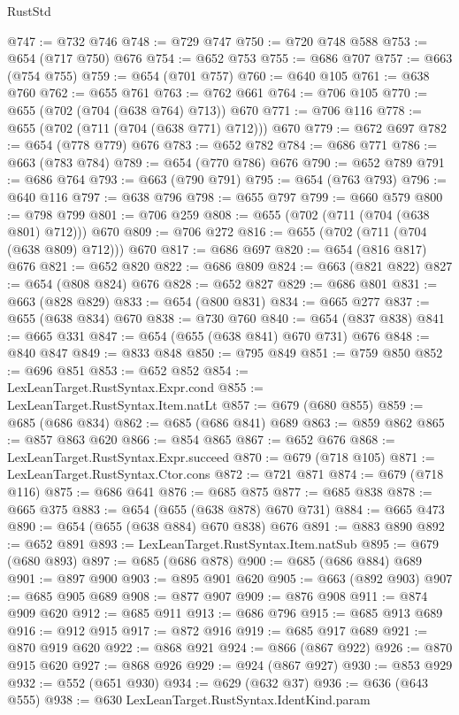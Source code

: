 \begin{lexlean}{RustStd}
\begin{coremodule}
{\begin{coremodule}
{{{{{{{{{{{{{{{@747 := @732 @746
@748 := @729 @747
@750 := @720 @748 @588
@753 := @654 (@717 @750) @676
@754 := @652 @753
@755 := @686 @707
@757 := @663 (@754 @755)
@759 := @654 (@701 @757)
@760 := @640 @105
@761 := @638 @760
@762 := @655 @761
@763 := @762 @661
@764 := @706 @105
@770 := @655 (@702 (@704 (@638 @764) @713)) @670
@771 := @706 @116
@778 := @655 (@702 (@711 (@704 (@638 @771) @712))) @670
@779 := @672 @697
@782 := @654 (@778 @779) @676
@783 := @652 @782
@784 := @686 @771
@786 := @663 (@783 @784)
@789 := @654 (@770 @786) @676
@790 := @652 @789
@791 := @686 @764
@793 := @663 (@790 @791)
@795 := @654 (@763 @793)
@796 := @640 @116
@797 := @638 @796
@798 := @655 @797
@799 := @660 @579
@800 := @798 @799
@801 := @706 @259
@808 := @655 (@702 (@711 (@704 (@638 @801) @712))) @670
@809 := @706 @272
@816 := @655 (@702 (@711 (@704 (@638 @809) @712))) @670
@817 := @686 @697
@820 := @654 (@816 @817) @676
@821 := @652 @820
@822 := @686 @809
@824 := @663 (@821 @822)
@827 := @654 (@808 @824) @676
@828 := @652 @827
@829 := @686 @801
@831 := @663 (@828 @829)
@833 := @654 (@800 @831)
@834 := @665 @277
@837 := @655 (@638 @834) @670
@838 := @730 @760
@840 := @654 (@837 @838)
@841 := @665 @331
@847 := @654 (@655 (@638 @841) @670 @731) @676
@848 := @840 @847
@849 := @833 @848
@850 := @795 @849
@851 := @759 @850
@852 := @696 @851
@853 := @652 @852
@854 := LexLeanTarget.RustSyntax.Expr.cond
@855 := LexLeanTarget.RustSyntax.Item.natLt
@857 := @679 (@680 @855)
@859 := @685 (@686 @834)
@862 := @685 (@686 @841) @689
@863 := @859 @862
@865 := @857 @863 @620
@866 := @854 @865
@867 := @652 @676
@868 := LexLeanTarget.RustSyntax.Expr.succeed
@870 := @679 (@718 @105)
@871 := LexLeanTarget.RustSyntax.Ctor.cons
@872 := @721 @871
@874 := @679 (@718 @116)
@875 := @686 @641
@876 := @685 @875
@877 := @685 @838
@878 := @665 @375
@883 := @654 (@655 (@638 @878) @670 @731)
@884 := @665 @473
@890 := @654 (@655 (@638 @884) @670 @838) @676
@891 := @883 @890
@892 := @652 @891
@893 := LexLeanTarget.RustSyntax.Item.natSub
@895 := @679 (@680 @893)
@897 := @685 (@686 @878)
@900 := @685 (@686 @884) @689
@901 := @897 @900
@903 := @895 @901 @620
@905 := @663 (@892 @903)
@907 := @685 @905 @689
@908 := @877 @907
@909 := @876 @908
@911 := @874 @909 @620
@912 := @685 @911
@913 := @686 @796
@915 := @685 @913 @689
@916 := @912 @915
@917 := @872 @916
@919 := @685 @917 @689
@921 := @870 @919 @620
@922 := @868 @921
@924 := @866 (@867 @922)
@926 := @870 @915 @620
@927 := @868 @926
@929 := @924 (@867 @927)
@930 := @853 @929
@932 := @552 (@651 @930)
@934 := @629 (@632 @37)
@936 := @636 (@643 @555)
@938 := @630 LexLeanTarget.RustSyntax.IdentKind.param
}}}}}}}}}}}}}}}
\end{coremodule}}
\end{coremodule}
\end{lexlean}
